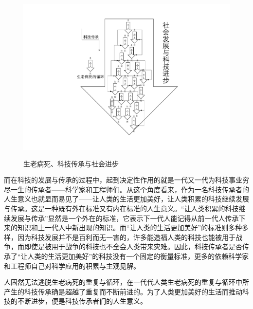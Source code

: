 \documentclass[a4paper]{ctexart}
\begin{document}
\begin{spacing}{1.3}
	\begin{figure}
		\centering
		\includegraphics[width=\textwidth, keepaspectratio]{figure/1.pdf}\\
		\caption{生老病死、科技传承与社会进步}
	\end{figure}
	而在科技的发展与传承的过程中，起到决定性作用的就是一代又一代为科技事业穷尽一生的传承者——科学家和工程师们。从这个角度看来，作为一名科技传承者的人生意义也就显而易见了——让人类的生活更加美好，让人类积累的科技继续发展与传承。这是一种既有外在标准又有内在标准的人生意义。“让人类积累的科技继续发展与传承”显然是一个外在的标准，它表示下一代人能记得从前一代人传承下来的知识和上一代人中新出现的知识。而“让人类的生活更加美好”的标准则多种多样，因为科技发展并不是百利而无一害的，许多能造福人类的科技也能被用于战争，而即使是被用于战争的科技也不全会人类带来灾难。因此，科技传承者是否传承了“让人类的生活更加美好”的科技没有一个固定的衡量标准，更多的依赖科学家和工程师自己对科学应用的积累与主观见解。

	人固然无法逃脱生老病死的重复与循环，在一代代人类生老病死的重复与循环中所产生的科技传承确是超越了重复而不断前进的。为了人类更加美好的生活而推动科技的不断进步，便是科技传承者们的人生意义。
\end{spacing}
\end{document}
